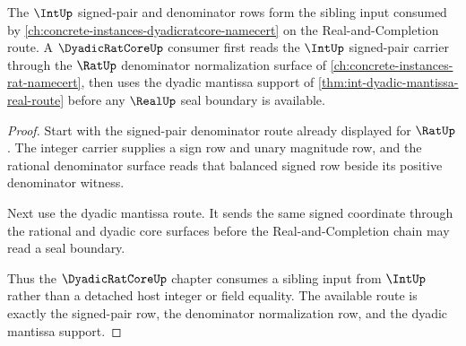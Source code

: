 \begin{theorem}
\label{thm:int-dyadicratcore-denominator-route-sibling-repair}
The $\IntUp$ signed-pair and denominator rows form the sibling input consumed by \autoref{ch:concrete-instances-dyadicratcore-namecert} on the Real-and-Completion route. A $\DyadicRatCoreUp$ consumer first reads the $\IntUp$ signed-pair carrier through the $\RatUp$ denominator normalization surface of \autoref{ch:concrete-instances-rat-namecert}, then uses the dyadic mantissa support of \autoref{thm:int-dyadic-mantissa-real-route} before any $\RealUp$ seal boundary is available.
\end{theorem}
\begin{proof}
Start with the signed-pair denominator route already displayed for $\RatUp$. The integer carrier supplies a sign row and unary magnitude row, and the rational denominator surface reads that balanced signed row beside its positive denominator witness.

Next use the dyadic mantissa route. It sends the same signed coordinate through the rational and dyadic core surfaces before the Real-and-Completion chain may read a seal boundary.

Thus the $\DyadicRatCoreUp$ chapter consumes a sibling input from $\IntUp$ rather than a detached host integer or field equality. The available route is exactly the signed-pair row, the denominator normalization row, and the dyadic mantissa support.
\end{proof}

